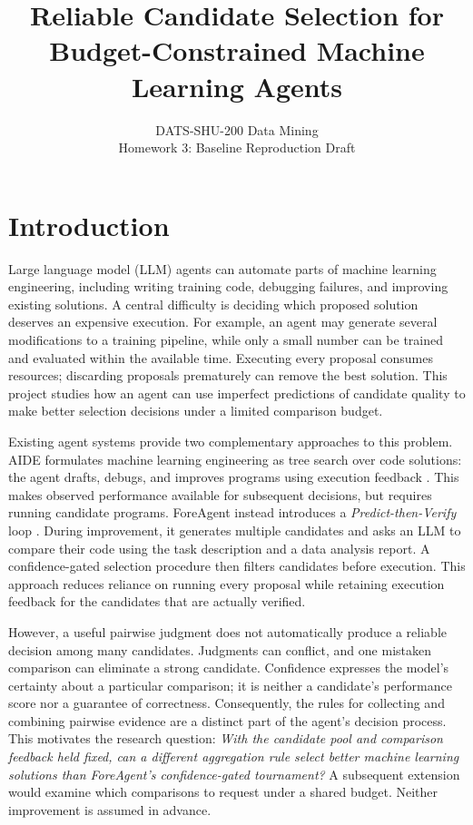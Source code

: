 \documentclass{article}
\title{Reliable Candidate Selection for\\Budget-Constrained Machine Learning Agents}
\author{DATS-SHU-200 Data Mining\\Homework 3: Baseline Reproduction Draft}
\begin{document}
\maketitle

\section{Introduction}

Large language model (LLM) agents can automate parts of machine learning engineering, including writing training code, debugging failures, and improving existing solutions. A central difficulty is deciding which proposed solution deserves an expensive execution. For example, an agent may generate several modifications to a training pipeline, while only a small number can be trained and evaluated within the available time. Executing every proposal consumes resources; discarding proposals prematurely can remove the best solution. This project studies how an agent can use imperfect predictions of candidate quality to make better selection decisions under a limited comparison budget.

Existing agent systems provide two complementary approaches to this problem. AIDE formulates machine learning engineering as tree search over code solutions: the agent drafts, debugs, and improves programs using execution feedback \citep{jiang2025aide}. This makes observed performance available for subsequent decisions, but requires running candidate programs. ForeAgent instead introduces a \emph{Predict-then-Verify} loop \citep{zheng2026predict}. During improvement, it generates multiple candidates and asks an LLM to compare their code using the task description and a data analysis report. A confidence-gated selection procedure then filters candidates before execution. This approach reduces reliance on running every proposal while retaining execution feedback for the candidates that are actually verified.

However, a useful pairwise judgment does not automatically produce a reliable decision among many candidates. Judgments can conflict, and one mistaken comparison can eliminate a strong candidate. Confidence expresses the model's certainty about a particular comparison; it is neither a candidate's performance score nor a guarantee of correctness. Consequently, the rules for collecting and combining pairwise evidence are a distinct part of the agent's decision process. This motivates the research question: \emph{With the candidate pool and comparison feedback held fixed, can a different aggregation rule select better machine learning solutions than ForeAgent's confidence-gated tournament?} A subsequent extension would examine which comparisons to request under a shared budget. Neither improvement is assumed in advance.
\end{document}
